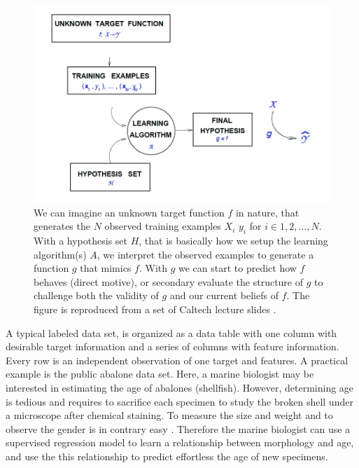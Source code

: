\begin{figure}[htbp]
\includegraphics[width=\textwidth,height=\textheight,keepaspectratio]{graphics/sketchMLmapping.png}
\caption{We can imagine an unknown target function $f$ in nature, that generates the $N$ observed training examples $X_i$ $y_i$ for $i \in 1,2,...,N$. With a hypothesis set $H$, that is basically how we setup the learning algorithm(s) $A$, we interpret the observed examples to generate a function $g$ that mimics $f$. With $g$ we can start to predict how $f$ behaves (direct motive), or secondary evaluate the structure of $g$ to challenge both the validity of $g$ and our current beliefs of $f$.
The figure is reproduced from a set of Caltech lecture slides \cite{Mostafa13learning}.
}
\label{modelPredictExplain}
\end{figure}

A typical labeled data set, is organized as a data table with one column with desirable target information and a series of columns with feature information. Every row is an independent observation of one target and features. A practical example is the public abalone data set. Here, a marine biologist may be interested in estimating the age of abalones (shellfish). However, determining age is tedious and requires to sacrifice each specimen to study the broken shell under a microscope after chemical staining. To measure the size and weight and to observe the gender is in contrary easy \cite{lichman2013uci}. Therefore the marine biologist can use a supervised regression model to learn a relationship between morphology and age, and use the this relationship to predict effortless the age of new specimens.

